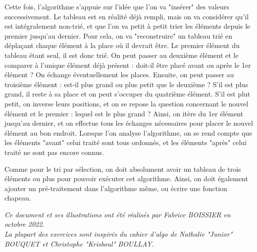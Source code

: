 \documentclass[11pt,a4paper]{article}
\begin{document}
Cette fois, l'algorithme s'appuie sur l'idée que l'on va "insérer" des valeurs successivement.
Le tableau est en réalité déjà rempli, mais on va considérer qu'il est intégralement non-trié, et que l'on va petit à petit trier les éléments depuis le premier jusqu'au dernier.
Pour cela, on va "reconstruire" un tableau trié en déplaçant chaque élément à la place où il devrait être.
Le premier élément du tableau étant seul, il est donc trié.
On peut passer au deuxième élément et le comparer à l'unique élément déjà présent : doit-il être placé avant ou après le 1er élément ?
On échange éventuellement les places.
Ensuite, on peut passer au troisième élément : est-il plus grand ou plus petit que le deuxième ?
S'il est plus grand, il reste à sa place et on peut s'occuper du quatrième élément.
S'il est plut petit, on inverse leurs positions, et on se repose la question concernant le nouvel élément et le premier : lequel est le plus grand ?
Ainsi, on itère du 1er élément jusqu'au dernier, et on effectue tous les échanges nécessaires pour placer le nouvel élément au bon endroit.
Lorsque l'on analyse l'algorithme, on se rend compte que les éléments "avant" celui traité sont tous ordonnés, et les éléments "après" celui traité ne sont pas encore connus.

Comme pour le tri par sélection, on doit absolument avoir un tableau de trois éléments ou plus pour pouvoir exécuter cet algorithme.
Ainsi, on doit également ajouter un pré-traitement dans l'algorithme même, ou écrire une fonction chapeau.



\vfillLast



\begin{center}
\textit{Ce document et ses illustrations ont été réalisés par Fabrice BOISSIER en octobre 2022.\\
La plupart des exercices sont inspirés du cahier d'algo de Nathalie "Junior" BOUQUET et Christophe "Krisboul" BOULLAY.}
\end{center}
\end{document}
